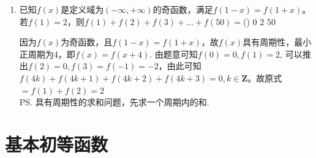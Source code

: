 \begin{enumerate}
    \item 已知$f(x)$是定义域为$(-\infty, +\infty)$的奇函数，满足$f(1-x) = f(1+x)$。若$f(1) = 2$，则$f(1)+f(2)+f(3)+...+f(50) = $\dotfill()
    {0}
    {2}
    {50}
    \begin{jieda}
        因为$f(x)$为奇函数，且$f(1-x) = f(1+x)$，故$f(x)$具有周期性，最小正周期为4，即$f(x) = f(x+4)$. 由题意可知$f(0) = 0, f(1) = 2$, 可以推出$f(2) = 0, f(3) = f(-1) = -2$，由此可知$f(4k)+f(4k+1)+f(4k+2)+f(4k+3)=0, k \in \mathbf{Z}$。故原式$= f(1) + f(2) = 2$ \\
        \ps 具有周期性的求和问题，先求一个周期内的和.
    \end{jieda}
\end{enumerate}
\section*{基本初等函数}
